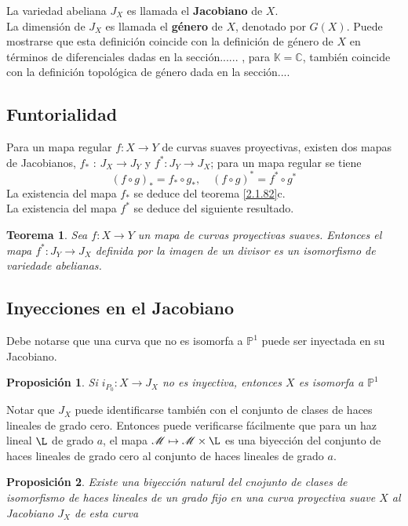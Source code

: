 \documentclass[12pt,a4paper]{report}
\newcommand{\K}{\mathbb{K}}
\newcommand{\C}{\mathbb{C}}
\newcommand{\M}{\mathscr{M}}
\newtheorem{teo}{Teorema}[chapter]
\newtheorem{prop}{Proposición}[chapter]
\begin{document}
La variedad abeliana $J_{X}$ es llamada el \textbf{Jacobiano} de $X$. \\
La dimensión de $J_{X}$ es llamada el \textbf{género} de $X$, denotado por $G(X)$. Puede mostrarse que esta definición coincide con la definición de género de $X$ en términos de diferenciales dadas en la sección...... , para $\K = \C$, también coincide con la definición topológica de género dada en la sección....


\subsection{Funtorialidad}
Para un mapa regular $f:X \rightarrow Y$ de curvas suaves proyectivas, existen dos mapas de Jacobianos, $f_{*}$   : $J_{X} \rightarrow J_{Y}$ y $f^{*}: J_{Y}\rightarrow J_{X} $; para un mapa regular se tiene $$ (f \circ g)_{*}  =  f_{*} \circ g_{*}, \quad (f \circ g)^{*}  =  f^{*} \circ g^{*} $$
La existencia del mapa $f_{*}$ se deduce del teorema \ref{2.1.82}c.\\
La existencia del mapa $f^{*}$  se deduce del siguiente resultado.
 
\begin{teo}
	Sea $f: X \rightarrow Y$ un mapa de curvas proyectivas suaves. Entonces el mapa $f^{*}: J_{Y} \rightarrow J_{X}$ definida por la imagen de un divisor es un isomorfismo de variedade abelianas.
\end{teo} 

\subsection{Inyecciones en el Jacobiano}
Debe notarse que una curva que no es isomorfa a $\mathbb{P}^{1}$ puede ser inyectada en su Jacobiano.

\begin{prop}
	Si $i_{P_{0}} :X \rightarrow J_{X}$ no es inyectiva, entonces $X$ es isomorfa a $\mathbb{P}^{1}$
\end{prop}

Notar que $J_{X}$ puede identificarse también con el conjunto de clases de haces lineales de grado cero. Entonces puede verificarse fácilmente que para un haz lineal $\L$ de grado $a$, el mapa $\M \mapsto \M \times \L$ es una biyección del conjunto de haces lineales de grado cero al conjunto de haces lineales de grado $a$. 

\begin{prop}
	Existe una biyección natural del cnojunto de clases de isomorfismo de haces lineales de un grado fijo en una curva proyectiva suave $X$ al Jacobiano $J_{X}$ de esta curva
\end{prop}
\end{document}
